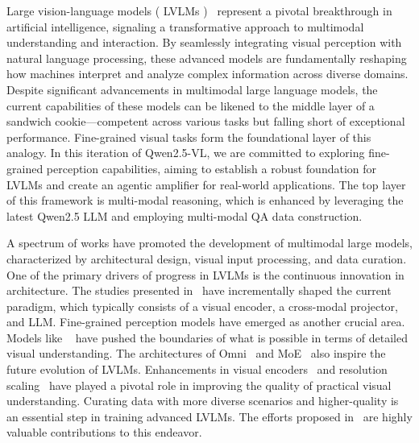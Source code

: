 Large vision-language models ( LVLMs )~\citep{gpt4o,sonnet3_5,team2023gemini,wang2024qwen2} represent a pivotal breakthrough in artificial intelligence, signaling a transformative approach to multimodal understanding and interaction. By seamlessly integrating visual perception with natural language processing, these advanced models are fundamentally reshaping how machines interpret and analyze complex information across diverse domains. Despite significant advancements in multimodal large language models, the current capabilities of these models can be likened to the middle layer of a sandwich cookie—competent across various tasks but falling short of exceptional performance. Fine-grained visual tasks form the foundational layer of this analogy. In this iteration of Qwen2.5-VL, we are committed to exploring fine-grained perception capabilities, aiming to establish a robust foundation for LVLMs and create an agentic amplifier for real-world applications. The top layer of this framework is multi-modal reasoning, which is enhanced by leveraging the latest Qwen2.5 LLM and employing multi-modal QA data construction.

A spectrum of works have promoted the development of multimodal large models, characterized by architectural design, visual input processing, and data curation. One of the primary drivers of progress in LVLMs is the continuous innovation in architecture. The studies presented in~\citep{flamingo, blip, blip2, llava, llava1.5, wang2024emu3, zhang2024internlm,wang2023internimage} have incrementally shaped the current paradigm, which typically consists of a visual encoder, a cross-modal projector, and LLM. Fine-grained perception models have emerged as another crucial area. Models like ~\citep{xiao2023florence,grounding_dino,ren2024grounding, ferretv2,zhang2024omg,kosmos2,deitke2024molmo} have pushed the boundaries of what is possible in terms of detailed visual understanding. The architectures of Omni~\citep{li2024baichuan,li2025baichuan,ye2024x} and MoE~\citep{riquelme2021scaling,lee2024moai,li2024uni,li2024aria,wu2024deepseek} also inspire the future evolution of LVLMs. Enhancements in visual encoders~\citep{internvl, liu2024points,liang2025global} and resolution scaling~\citep{monkey,mplug-owl2,Otterhd} have played a pivotal role in improving the quality of practical visual understanding. Curating data with more diverse scenarios and higher-quality is an essential step in training advanced LVLMs. The efforts proposed in~\citep{guo2024mammoth,chen2024expanding, liu2024mminstruct, chen2024allava, tong2024cambrian, li2024llava} are highly valuable contributions to this endeavor. 

